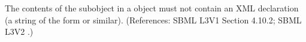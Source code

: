 The contents of the \Message subobject in a \Constraint object must not
contain an XML declaration (\ie a string of the form  or similar).  (References: SBML L3V1 Section 4.10.2; SBML L3V2
.)
